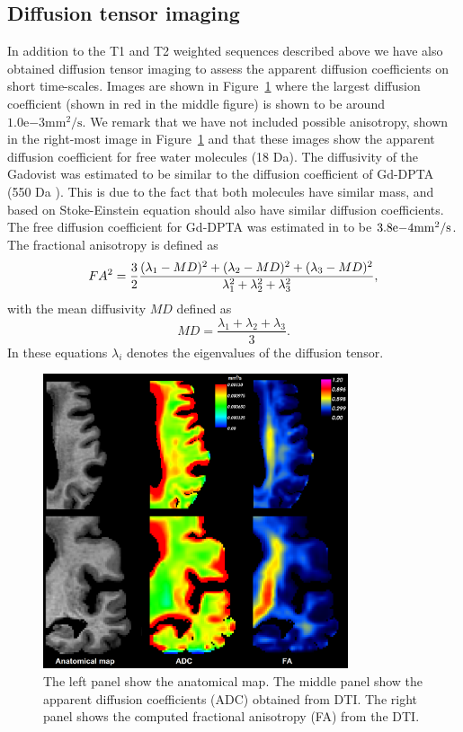 \documentclass[11pt,a4paper]{article}
\begin{document}
\subsection{Diffusion tensor imaging}
In addition to the T1 and T2 weighted sequences described above we have also obtained diffusion tensor imaging to assess the apparent diffusion 
coefficients on short time-scales. Images are shown in Figure~\ref{figuredti} where the largest diffusion coefficient (shown in 
red in the middle figure) is shown to be around $1.0\mathrm{e}{-3}  \mathrm{mm^2/s}$. We remark that we have not included possible anisotropy, shown in 
the right-most image in Figure~\ref{figuredti} and that these images show the apparent diffusion coefficient for free water molecules (18 Da).      
The diffusivity of the Gadovist \cite{MGadobutrol} was estimated to be similar to the diffusion coefficient of Gd-DPTA (550 Da \cite{MGgDPTA}). This is due to the fact that both molecules have similar mass, and based on Stoke-Einstein equation should also have similar diffusion coefficients. The free diffusion coefficient for Gd-DPTA was estimated in \citet{GdDPTA-DIFFUSION} to be $3.8\mathrm{e}{-4}\mathrm{mm\sp{2}/s}$.
The fractional anisotropy is defined as 
\begin{equation}
FA\sp{2} =  \frac{3}{2} \frac{ (\lambda_1 - MD )\sp{2} +(\lambda_2 - MD )\sp{2} +(\lambda_3 - MD )\sp{2}}{\lambda\sp{2}_1 + \lambda\sp{2}_2  +\lambda\sp{2}_3 },
\end{equation}
with the mean diffusivity $MD$ defined as 
\begin{equation}
MD = \frac{\lambda_1 +\lambda_2 +\lambda_3 }{3}.
\end{equation}
In these equations $\lambda_i$ denotes the eigenvalues of the diffusion tensor.
\begin{figure}
\centering
\includegraphics[width=0.80\textwidth]{DTI-zoom.png} 
\caption{The left panel show the anatomical map. The middle panel show the apparent diffusion coefficients (ADC) obtained from DTI. The right panel shows the computed fractional anisotropy (FA) from the DTI.}
\label{figuredti} 
\end{figure}
\end{document}
